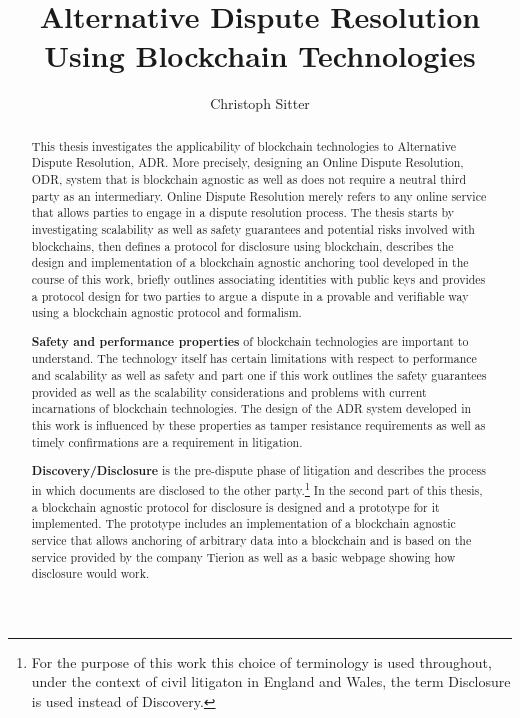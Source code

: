 \documentclass[12pt,msc,a4paper,oneside]{ucl_thesis}
\title{Alternative Dispute Resolution Using Blockchain Technologies}
\author{Christoph Sitter
}
\begin{document}
\maketitle
\makedeclaration


\begin{abstract}
    This thesis investigates the applicability of blockchain technologies to Alternative Dispute Resolution, ADR. More precisely, designing an Online Dispute Resolution, ODR, system that is blockchain agnostic as well as does not require a neutral third party as an intermediary. Online Dispute Resolution merely refers to any online service that allows parties to engage in a dispute resolution process. The thesis starts by investigating scalability as well as safety guarantees and potential risks involved with blockchains, then defines a protocol for disclosure using blockchain, describes the design and implementation of a blockchain agnostic anchoring tool developed in the course of this work, briefly outlines associating identities with public keys and provides a protocol design for two parties to argue a dispute in a provable and verifiable way using a blockchain agnostic protocol and formalism.

    \textbf{Safety and performance properties} of blockchain technologies are important to understand. The technology itself has certain limitations with respect to performance and scalability as well as safety and part one if this work outlines the safety guarantees provided as well as the scalability considerations and problems with current incarnations of blockchain technologies. The design of the ADR system developed in this work is influenced by these properties as tamper resistance requirements as well as timely confirmations are a requirement in litigation.

    \textbf{Discovery/Disclosure} is the pre-dispute phase of litigation and describes the process in which documents are disclosed to the other party.\footnote{For the purpose of this work this choice of terminology is used throughout, under the context of civil litigaton in England and Wales, the term Disclosure is used instead of Discovery.} In the second part of this thesis, a blockchain agnostic protocol for disclosure is designed and a prototype for it implemented. The prototype includes an implementation of a blockchain agnostic service that allows anchoring of arbitrary data into a blockchain and is based on the service provided by the company Tierion as well as a basic webpage showing how disclosure would work.


\end{abstract}
\end{document}
